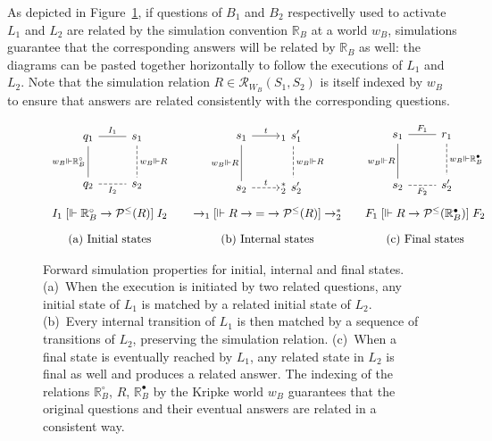 \documentclass[11pt,oneside,draft]{book}
\theoremstyle{definition}
\newcommand{\ifr}[1]{\mathrel{[{#1}]}}
\newcommand{\que}{\circ}         %
\newcommand{\ans}{\bullet}       %
\begin{document}
As depicted in Figure~\ref{fig:fsim},
if questions of $B_1$ and $B_2$
respectivelly used to activate $L_1$ and $L_2$
are related by the simulation convention $\mathbb{R}_B$
at a world $w_B$,
simulations guarantee that the corresponding answers will be related
by $\mathbb{R}_B$ as well:
the diagrams
can be pasted together horizontally
to follow the executions of $L_1$ and $L_2$.
Note that
the simulation relation $R \in \mathcal{R}_{W_B}(S_1, S_2)$
is itself indexed by $w_B$
to ensure that answers
are related consistently with the corresponding questions.

\begin{figure} %
  \[
    \begin{array}{c@{\qquad}c@{\qquad}c}
      \begin{tikzcd}[row sep=large]
        q_1 \ar[d, "w_B \Vdash \mathbb{R}_B^\que"', dash] \ar[r, dash, "I_1"] &
        s_1 \ar[d, "w_B \Vdash R", dash, dashed] \\
        q_2 \ar[r, "I_2"', dash, dashed] &
        s_2
      \end{tikzcd}
      &
      \begin{tikzcd}[row sep=large]
        s_1 \ar[r, "t"] \ar[d, "w_B \Vdash R"', dash] &
        \!\!{}_1 \:\, s_1' \ar[d, "w_B \Vdash R", dash, dashed] \\
        s_2 \ar[r, "t", dashed] &
        \!\!{}_2^* \:\, s_2'
      \end{tikzcd}
      &
      \begin{tikzcd}[row sep=large]
        s_1 \ar[r, "F_1", dash] \ar[d, "w_B \Vdash R"', dash] &
        r_1 \ar[d, "w_B \Vdash \mathbb{R}_B^\ans", dash, dashed] \\
        s_2 \ar[r, "F_2"', dash, dashed] &
        s_2'
      \end{tikzcd}
      \\[3.5em]
      I_1 \ifr{\Vdash \mathbb{R}_B^\que \rightarrow \mathcal{P}^\le(R)} I_2
      &
      {\rightarrow_1}
      \ifr{\Vdash R \rightarrow {=} \rightarrow \mathcal{P}^\le(R)}
      {\rightarrow_2^*}
      &
      F_1
      \ifr{\Vdash R \rightarrow \mathcal{P}^\le(\mathbb{R}_B^\ans)}
      F_2
      \\[1em]
      \text{(a) Initial states} &
      \text{(b) Internal states} &
      \text{(c) Final states}
    \end{array}
  \]
  \caption[Forward simulation properties]%
   {Forward simulation properties for initial, internal and final states.
    (a)~When the execution is initiated by two related questions,
    any initial state of $L_1$ is matched by
    a related initial state of $L_2$.
    (b)~Every internal transition of $L_1$ is then matched by
    a sequence of transitions of $L_2$,
    preserving the simulation relation.
    (c)~When a final state is eventually reached by $L_1$,
    any related state in $L_2$ is final as well and
    produces a related answer.
    The indexing of the relations
    $\mathbb{R}_B^\que$, $R$, $\mathbb{R}_B^\ans$
    by the Kripke world $w_B$
    guarantees that the original questions and their eventual answers
    are related in a consistent way.}
  \label{fig:fsim}
\end{figure}
\end{document}
